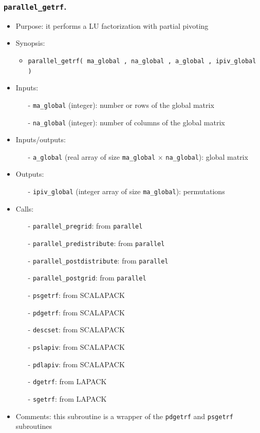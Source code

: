 \documentclass[12pt]{article}
\begin{document}
\subsubsection{{\tt parallel\_getrf}.}
\begin{itemize}
\item Purpose: it performs a LU factorization with partial pivoting
\item Synopsis: 
\begin{itemize}
\item {\tt parallel\_getrf( ma\_global , na\_global , a\_global , ipiv\_global )}
\end{itemize}
\item Inputs: 
\begin{itemize}
\item[-] {\tt ma\_global} (integer): number or rows of the global matrix
\item[-] {\tt na\_global} (integer): number of columns of the global matrix
\end{itemize}
\item Inputs/outputs: 
\begin{itemize}
\item[-] {\tt a\_global} (real array of size {\tt ma\_global} $\times$ {\tt na\_global}): global matrix
\end{itemize}
\item Outputs: 
\begin{itemize}
\item[-] {\tt ipiv\_global} (integer array of size {\tt ma\_global}): permutations
\end{itemize}
\item Calls: 
\begin{itemize}
\item[-] {\tt parallel\_pregrid}: from {\tt parallel}
\item[-] {\tt parallel\_predistribute}: from {\tt parallel}
\item[-] {\tt parallel\_postdistribute}: from {\tt parallel}
\item[-] {\tt parallel\_postgrid}: from {\tt parallel}
\item[-] {\tt psgetrf}: from SCALAPACK
\item[-] {\tt pdgetrf}: from SCALAPACK
\item[-] {\tt descset}: from SCALAPACK
\item[-] {\tt pslapiv}: from SCALAPACK
\item[-] {\tt pdlapiv}: from SCALAPACK
\item[-] {\tt dgetrf}: from LAPACK
\item[-] {\tt sgetrf}: from LAPACK
\end{itemize}
\item Comments: this subroutine is a wrapper of the {\tt pdgetrf} and {\tt psgetrf} subroutines
\end{itemize} 
\end{document}
